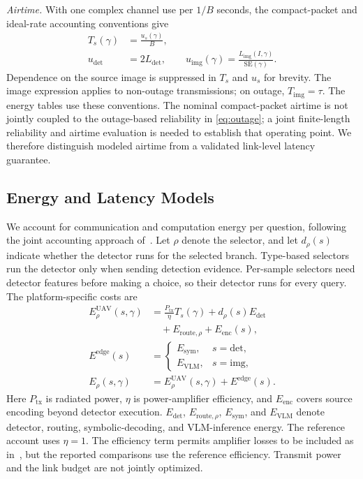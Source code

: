 \emph{Airtime.}\label{subsec:accounting}
With one complex channel use per $1/B$ seconds, the compact-packet
and ideal-rate accounting conventions give
\begin{equation}\label{eq:uses}
\begin{aligned}
T_s(\gamma)&=\frac{u_s(\gamma)}{B},\\
u_{\mathrm{det}}&=2L_{\mathrm{det}},\qquad
u_{\mathrm{img}}(\gamma)=
\frac{L_{\mathrm{img}}(I,\gamma)}{\mathrm{SE}(\gamma)}.
\end{aligned}
\end{equation}
Dependence on the source image is suppressed in $T_s$ and $u_s$ for
brevity. The image expression applies to non-outage transmissions; on outage,
$T_{\mathrm{img}}=\tau$. The energy tables use these conventions.
The nominal compact-packet airtime is not jointly coupled to the
outage-based reliability in \eqref{eq:outage}; a joint finite-length
reliability and airtime evaluation is needed to establish that
operating point. We therefore distinguish modeled airtime from a
validated link-level latency guarantee.

\subsection{Energy and Latency Models}\label{subsec:energyacct}
We account for communication and computation energy per question,
following the joint accounting approach of~\cite{dai2025pscom}.
Let $\rho$ denote the selector, and let $d_\rho(s)$ indicate whether
the detector runs for the selected branch. Type-based selectors run
the detector only when sending detection evidence. Per-sample
selectors need detector features before making a choice, so their
detector runs for every query. The platform-specific costs are
\begin{equation}\label{eq:energy}
\begin{aligned}
E_\rho^{\mathrm{UAV}}(s,\gamma)
 &=\frac{P_{\mathrm{tx}}}{\eta}T_s(\gamma)
   +d_\rho(s)E_{\mathrm{det}}\\
 &\quad+E_{\mathrm{route},\rho}+E_{\mathrm{enc}}(s),\\
E^{\mathrm{edge}}(s)
 &=\begin{cases}
 E_{\mathrm{sym}}, & s=\mathrm{det},\\
 E_{\mathrm{VLM}}, & s=\mathrm{img},
 \end{cases}\\
E_\rho(s,\gamma)
 &=E_\rho^{\mathrm{UAV}}(s,\gamma)+E^{\mathrm{edge}}(s).
\end{aligned}
\end{equation}
Here $P_{\mathrm{tx}}$ is radiated power, $\eta$ is power-amplifier
efficiency, and $E_{\mathrm{enc}}$ covers source encoding beyond
detector execution. $E_{\mathrm{det}}$, $E_{\mathrm{route},\rho}$,
$E_{\mathrm{sym}}$, and $E_{\mathrm{VLM}}$ denote detector, routing,
symbolic-decoding, and VLM-inference energy. The reference account
uses $\eta=1$. The efficiency term permits amplifier losses to be
included as in~\cite{cui2005energy}, but the reported comparisons
use the reference efficiency. Transmit power and the link budget
are not jointly optimized.

